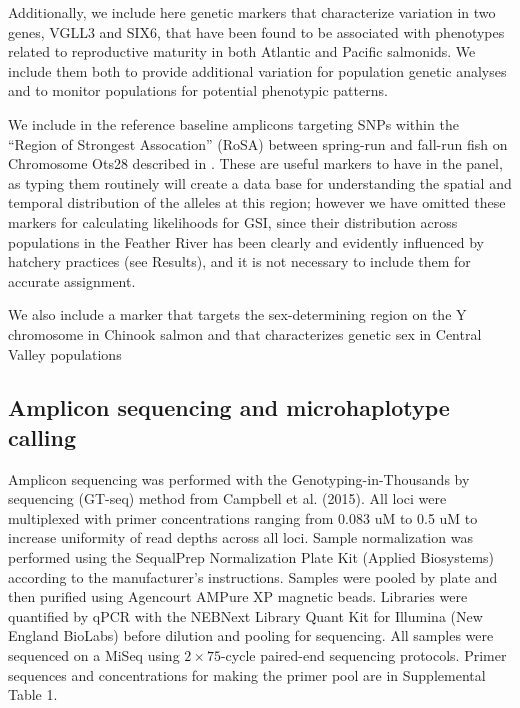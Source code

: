 Additionally, we include here genetic markers that characterize variation in two genes, VGLL3 and SIX6,
that have been found to be associated with phenotypes related to reproductive maturity in both
Atlantic \citep{barson2015sex} and Pacific \citep{waters2021heterogeneous} salmonids. We include
them both to provide additional variation for population genetic analyses and to
monitor populations for potential phenotypic patterns.

We include in the reference baseline amplicons targeting SNPs within the ``Region of Strongest Assocation'' (RoSA)
between spring-run and fall-run fish on Chromosome Ots28 described in \citet{thompson2020complex}.  These are useful markers to
have in the panel, as typing them routinely will create a data base for understanding the spatial and temporal
distribution of the alleles at this region; however we have omitted these markers for calculating likelihoods for
GSI, since their distribution across populations in the Feather River has been clearly and evidently
influenced by hatchery practices (see Results), and it is not necessary to include them for accurate assignment.


We also include a marker that targets the sex-determining region on the Y chromosome in Chinook salmon
and that characterizes genetic sex in Central Valley populations 


\subsection*{Amplicon sequencing and microhaplotype calling}

Amplicon sequencing was performed with the Genotyping-in-Thousands by sequencing (GT-seq) method from Campbell et al. (2015). All loci were 
multiplexed with primer concentrations ranging from 0.083 uM to 0.5 uM to increase uniformity of read depths across all loci. Sample normalization was 
performed using the SequalPrep Normalization Plate Kit (Applied Biosystems) according to the manufacturer's instructions. Samples were pooled by plate 
and then purified using Agencourt AMPure XP magnetic beads. Libraries were quantified by qPCR with the NEBNext Library Quant Kit for Illumina (New 
England BioLabs) before dilution and pooling for sequencing. All samples were sequenced on a MiSeq using $2\times 75$-cycle paired-end sequencing protocols. 
Primer sequences and concentrations for making the primer pool are in Supplemental Table 1. 

